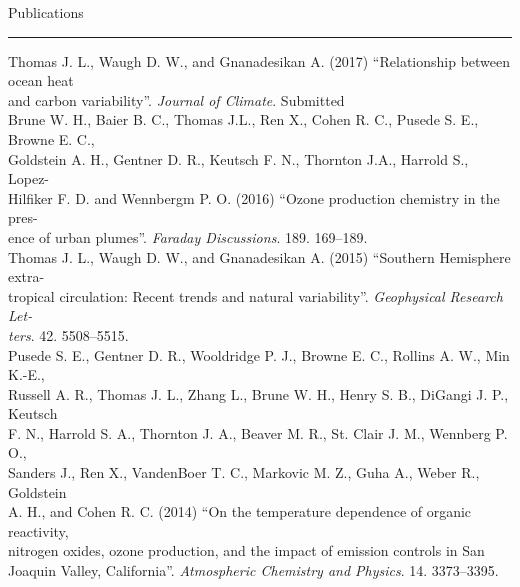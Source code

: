 \begin{cv}
  \vspace{1cm}
  \noindent\Large{Publications}\\
  \vspace{0.2cm}
  \noindent\rule{\textwidth}{0.4pt}
  \normalsize{
  Thomas J. L., Waugh D. W., and Gnanadesikan A. (2017) ``Relationship between ocean heat\\
  \indent and carbon variability''. \textit{Journal of Climate}. Submitted \\
  Brune W. H., Baier B. C., Thomas J.L., Ren X., Cohen R. C., Pusede S. E., Browne E. C.,\\
  \indent Goldstein A. H., Gentner D. R., Keutsch F. N., Thornton J.A., Harrold S., Lopez-\\
  \indent Hilfiker F. D. and  Wennbergm P. O. (2016) ``Ozone production chemistry in the pres-\\
  \indent ence of urban plumes''. \textit{Faraday Discussions}. 189. 169--189. \\
  Thomas J. L., Waugh D. W., and Gnanadesikan A. (2015) ``Southern Hemisphere extra- \\
  \indent tropical circulation: Recent trends and natural variability''.
  \textit{Geophysical Research Let-}\\
  \indent \textit{ters}. 42. 5508--5515. \\
  Pusede S. E., Gentner D. R., Wooldridge P. J., Browne E. C., Rollins A. W., Min K.-E., \\
  \indent Russell A. R., Thomas J. L., Zhang L., Brune W. H., Henry S. B., DiGangi J. P., Keutsch \\
  \indent F. N., Harrold S. A., Thornton  J. A., Beaver M. R., St. Clair J. M., Wennberg P. O., \\
  \indent  Sanders J., Ren X., VandenBoer T. C., Markovic M. Z., Guha A., Weber R., Goldstein  \\
  \indent A. H., and Cohen R. C. (2014) ``On the temperature dependence of organic reactivity,\\
  \indent nitrogen oxides, ozone production, and the impact of emission controls in San \\
  \indent Joaquin Valley, California''. \textit{Atmospheric Chemistry and Physics}. 14. 3373--3395.

}
\end{cv}
